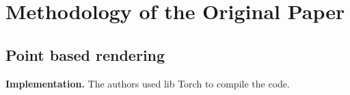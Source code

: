 \section{Methodology of the Original Paper}
\label{sec:methodo_paper}

\subsection{Point based rendering}
\label{subsec:Projecting points}



\noindent\textbf{Implementation.} The authors used lib Torch to compile the code. 


